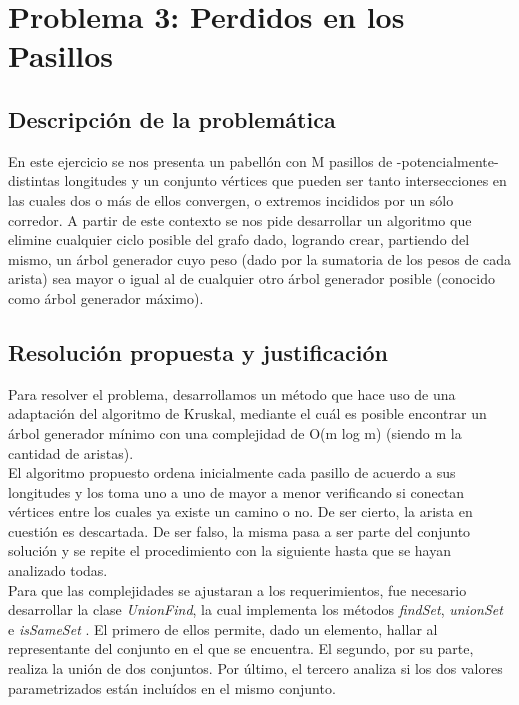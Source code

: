 \section{Problema 3: Perdidos en los Pasillos}

\subsection{Descripción de la problemática}

En este ejercicio se nos presenta un pabellón con M pasillos de -potencialmente- distintas longitudes y un conjunto vértices que pueden ser tanto intersecciones en las cuales dos o más de ellos convergen, o extremos incididos por un sólo corredor. 
A partir de este contexto se nos pide desarrollar un algoritmo que elimine cualquier ciclo posible del grafo dado, logrando crear, partiendo del mismo, un árbol generador cuyo peso (dado por la sumatoria de los pesos de cada arista) sea mayor o igual al de cualquier otro árbol generador posible (conocido como árbol generador máximo).

\subsection{Resolución propuesta y justificación}

Para resolver el problema, desarrollamos un método que hace uso de una adaptación del algoritmo de Kruskal, mediante el cuál es posible encontrar un árbol generador mínimo con una complejidad de O(m log m) (siendo m la cantidad de aristas).\\
El algoritmo propuesto ordena inicialmente cada pasillo de acuerdo a sus longitudes y los toma uno a uno de mayor a menor verificando si conectan vértices entre los cuales ya existe un camino o no. De ser cierto, la arista en cuestión es descartada. De ser falso, la misma pasa a ser parte del conjunto solución y se repite el procedimiento con la siguiente hasta que se hayan analizado todas.\\
Para que las complejidades se ajustaran a los requerimientos, fue necesario desarrollar la clase \textit{UnionFind}, la cual implementa los métodos \textit{findSet}, \textit{unionSet} e \textit{isSameSet} . El primero de ellos permite, dado un elemento, hallar al representante del conjunto en el que se encuentra. El segundo, por su parte, realiza la unión de dos conjuntos. Por último, el tercero analiza si los dos valores parametrizados están incluídos en el mismo conjunto. \\

